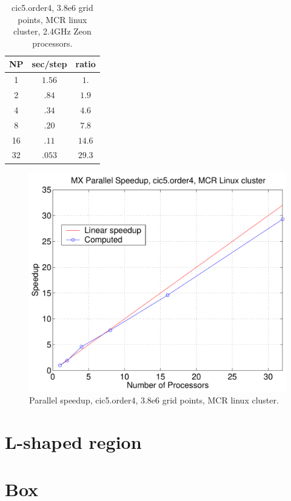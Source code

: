\documentclass[11pt]{article}
\begin{document}
\begin{table}[hbt]
\begin{center}\footnotesize
\begin{tabular}{|c|c|c|} \hline 
     NP       & sec/step   & ratio \\   \hline\hline 
     1        &  $1.56$    & $ 1. $   \\ 
     2        &  $.84 $    & $ 1.9 $   \\ 
     4        &  $.34 $    & $ 4.6 $   \\ 
     8        &  $.20 $    & $ 7.8 $   \\ 
    16        &  $.11 $    & $14.6 $   \\ 
    32        &  $.053$    & $29.3 $   \\ \hline 
\end{tabular}		
\end{center}		
\caption{cic5.order4, 3.8e6 grid points, MCR linux cluster, 2.4GHz Zeon processors.}
 \label{tab:box} 
\end{table}

\begin{figure}
\begin{center}
  \includegraphics[width=.5\linewidth]{figures/speedupMCR-cic5-order4}
\end{center}
\caption{Parallel speedup, cic5.order4, 3.8e6 grid points, MCR linux cluster.}
\end{figure}

\clearpage
\section{L-shaped region}

\clearpage
\section{Box}
\end{document}
